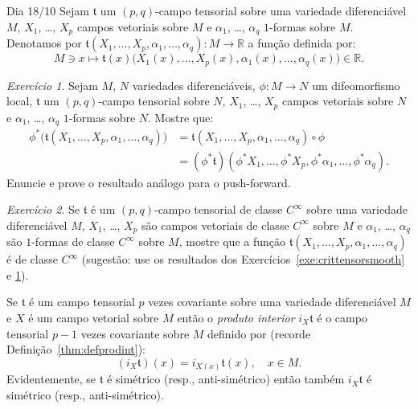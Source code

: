 \documentclass[oneside,11pt]{amsart}
\newcommand{\R}{\mathds R}
\theoremstyle{remark}\newtheorem{exercise}{Exercício}[section]
\theoremstyle{plain}\newtheorem{teo}{Teorema}[section]
\theoremstyle{plain}\newtheorem{lem}[teo]{Lema}
\theoremstyle{plain}\newtheorem{prop}[teo]{Proposição}
\theoremstyle{definition}\newtheorem{defin}[teo]{Definição}
\theoremstyle{remark}\newtheorem{rem}[teo]{Observação}
\theoremstyle{definition}\newtheorem{example}[teo]{Exemplo}
\numberwithin{equation}{section}
\begin{document}
\begin{section}{Dia 18/10}
Sejam $\mathfrak t$ um $(p,q)$-campo tensorial sobre uma variedade diferenciável $M$, $X_1$, \dots, $X_p$ campos vetoriais sobre $M$
e $\alpha_1$, \dots, $\alpha_q$ $1$-formas sobre $M$. Denotamos por $\mathfrak t(X_1,\ldots,X_p,\alpha_1,\ldots,\alpha_q):M\to\R$ a função definida
por:
\[M\ni x\longmapsto\mathfrak t(x)\big(X_1(x),\ldots,X_p(x),\alpha_1(x),\ldots,\alpha_q(x)\big)\in\R.\]
\begin{exercise}\label{exe:pushaval}
Sejam $M$, $N$ variedades diferenciáveis, $\phi:M\to N$ um difeomorfismo local, $\mathfrak t$ um $(p,q)$-campo tensorial sobre $N$, $X_1$, \dots, $X_p$
campos vetoriais sobre $N$ e $\alpha_1$, \dots, $\alpha_q$ $1$-formas sobre $N$. Mostre que:
\begin{align*}
\phi^*\big(\mathfrak t(X_1,\ldots,X_p,\alpha_1,\ldots,\alpha_q)\big)&=
\mathfrak t(X_1,\ldots,X_p,\alpha_1,\ldots,\alpha_q)\circ\phi\\
&=(\phi^*\mathfrak t)(\phi^*X_1,\ldots,\phi^*X_p,\phi^*\alpha_1,\ldots,\phi^*\alpha_q).
\end{align*}
Enuncie e prove o resultado análogo para o push-forward.
\end{exercise}

\begin{exercise}\label{exe:avalsmooth}
Se $\mathfrak t$ é um $(p,q)$-campo tensorial de classe $C^\infty$ sobre uma variedade diferenciável $M$, $X_1$, \dots, $X_p$ são campos vetoriais
de classe $C^\infty$ sobre $M$ e $\alpha_1$, \dots, $\alpha_q$ são $1$-formas de classe $C^\infty$ sobre $M$, mostre que a função
$\mathfrak t(X_1,\ldots,X_p,\alpha_1,\ldots,\alpha_q)$ é de classe $C^\infty$ (sugestão: use os resultados dos Exercícios~\ref{exe:crittensorsmooth} e \ref{exe:pushaval}).
\end{exercise}

Se $\mathfrak t$ é um campo tensorial $p$ vezes covariante sobre uma variedade diferenciável $M$ e $X$ é um campo vetorial sobre $M$ então o {\em produto interior\/}
$i_X\mathfrak t$ é o campo tensorial $p-1$ vezes covariante sobre $M$ definido por (recorde Definição~\ref{thm:defprodint}):
\[(i_X\mathfrak t)(x)=i_{X(x)}\mathfrak t(x),\quad x\in M.\]
Evidentemente, se $\mathfrak t$ é simétrico (resp., anti-simétrico) então também $i_X\mathfrak t$ é simétrico (resp., anti-simétrico).


\end{section}
\end{document}
